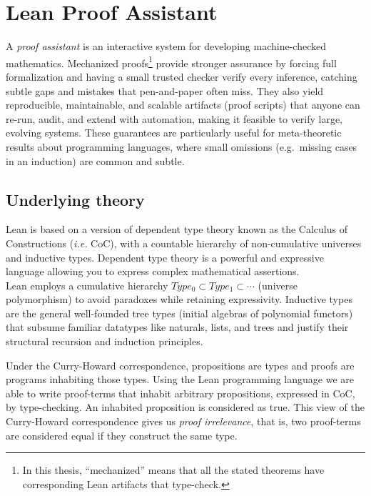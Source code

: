 \documentclass[12pt,a4paper,twoside]{book}
\begin{document}
\section{Lean Proof Assistant}
\label{background:proofassistants}

A \emph{proof assistant} is an interactive system for developing machine-checked mathematics.
Mechanized proofs\footnote{In this thesis, ``mechanized'' means that all the stated theorems have corresponding Lean artifacts that type-check.} provide stronger assurance by forcing full formalization and having a small trusted checker verify every inference, catching subtle gaps and mistakes that pen-and-paper often miss. They also yield reproducible, maintainable, and scalable artifacts (proof scripts) that anyone can re-run, audit, and extend with automation, making it feasible to verify large, evolving systems\cite{harrison2014history}.
These guarantees are particularly useful for meta-theoretic results about programming languages, where small omissions (e.g.\ missing cases in an induction) are common and subtle\cite{aydemir2005mechanized}.

\subsection{Underlying theory}
Lean is based on a version of dependent type theory known as the Calculus of Constructions\cite{coquand1986calculus} (\emph{i.e.} CoC), with a countable hierarchy of non-cumulative universes and inductive types\cite{avigad2021theorem}. Dependent type theory is a powerful and expressive language allowing you to express complex mathematical assertions.\\
Lean employs a cumulative hierarchy $Type_0 \subset Type_1 \subset \cdots$ (universe polymorphism) to avoid paradoxes while retaining expressivity\cite{martin1984intuitionistic}.
Inductive types are the general well-founded tree types (initial algebras of polynomial functors) that subsume familiar datatypes like naturals, lists, and trees and justify their structural recursion and induction principles\cite{martin1984intuitionistic}.

Under the Curry-Howard correspondence, propositions are types and proofs are programs inhabiting those types\cite{howard1980formulae}.
Using the Lean programming language we are able to write proof-terms that inhabit arbitrary propositions, expressed in CoC, by type-checking. An inhabited proposition is considered as true. This view of the Curry-Howard correspondence gives us \emph{proof irrelevance}, that is, two proof-terms are considered equal if they construct the same type.
\end{document}
